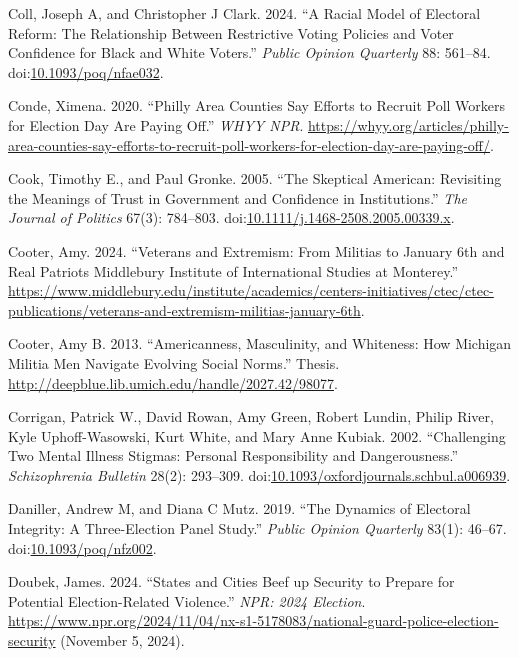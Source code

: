 \documentclass[
  11pt,
  a4paper,
]{scrartcl}
\newlength{\cslhangindent}
\newenvironment{CSLReferences}[2] %
 {\begin{list}{}{%
  \setlength{\itemindent}{0pt}
  \setlength{\leftmargin}{0pt}
  \setlength{\parsep}{0pt}
  \ifodd #1
   \setlength{\leftmargin}{\cslhangindent}
   \setlength{\itemindent}{-1\cslhangindent}
  \fi
  \setlength{\itemsep}{#2\baselineskip}}}
 {\end{list}}
\begin{document}
\begin{CSLReferences}{1}{1}
Coll, Joseph A, and Christopher J Clark. 2024. {``A {Racial Model} of
{Electoral Reform}: {The Relationship} Between {Restrictive Voting
Policies} and {Voter Confidence} for {Black} and {White Voters}.''}
\emph{Public Opinion Quarterly} 88: 561--84.
doi:\href{https://doi.org/10.1093/poq/nfae032}{10.1093/poq/nfae032}.

Conde, Ximena. 2020. {``Philly Area Counties Say Efforts to Recruit Poll
Workers for {Election Day} Are Paying Off.''} \emph{WHYY NPR}.
\url{https://whyy.org/articles/philly-area-counties-say-efforts-to-recruit-poll-workers-for-election-day-are-paying-off/}.

Cook, Timothy E., and Paul Gronke. 2005. {``The {Skeptical American}:
{Revisiting} the {Meanings} of {Trust} in {Government} and {Confidence}
in {Institutions}.''} \emph{The Journal of Politics} 67(3): 784--803.
doi:\href{https://doi.org/10.1111/j.1468-2508.2005.00339.x}{10.1111/j.1468-2508.2005.00339.x}.

Cooter, Amy. 2024. {``Veterans and {Extremism}: {From Militias} to
{January} 6th and {Real Patriots} \textbar{} {Middlebury Institute} of
{International Studies} at {Monterey}.''}
\url{https://www.middlebury.edu/institute/academics/centers-initiatives/ctec/ctec-publications/veterans-and-extremism-militias-january-6th}.

Cooter, Amy B. 2013. {``Americanness, {Masculinity}, and {Whiteness}:
{How Michigan Militia Men Navigate Evolving Social Norms}.''} Thesis.
\url{http://deepblue.lib.umich.edu/handle/2027.42/98077}.

Corrigan, Patrick W., David Rowan, Amy Green, Robert Lundin, Philip
River, Kyle Uphoff-Wasowski, Kurt White, and Mary Anne Kubiak. 2002.
{``Challenging {Two Mental Illness Stigmas}: {Personal Responsibility}
and {Dangerousness}.''} \emph{Schizophrenia Bulletin} 28(2): 293--309.
doi:\href{https://doi.org/10.1093/oxfordjournals.schbul.a006939}{10.1093/oxfordjournals.schbul.a006939}.

Daniller, Andrew M, and Diana C Mutz. 2019. {``The {Dynamics} of
{Electoral Integrity}: {A Three-Election Panel Study}.''} \emph{Public
Opinion Quarterly} 83(1): 46--67.
doi:\href{https://doi.org/10.1093/poq/nfz002}{10.1093/poq/nfz002}.

Doubek, James. 2024. {``States and Cities Beef up Security to Prepare
for Potential Election-Related Violence.''} \emph{NPR: 2024 Election}.
\url{https://www.npr.org/2024/11/04/nx-s1-5178083/national-guard-police-election-security}
(November 5, 2024).


\end{CSLReferences}
\end{document}

